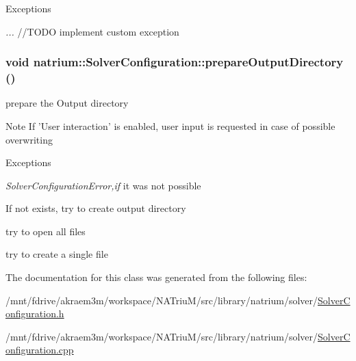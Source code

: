 \begin{DoxyExceptions}{Exceptions}
\item[{\em ...}]//TODO implement custom exception \end{DoxyExceptions}
\hypertarget{classnatrium_1_1SolverConfiguration_a69c009fd87690677b66ab10a000d07f6}{
\subsubsection[{prepareOutputDirectory}]{\setlength{\rightskip}{0pt plus 5cm}void natrium::SolverConfiguration::prepareOutputDirectory ()}}
\label{classnatrium_1_1SolverConfiguration_a69c009fd87690677b66ab10a000d07f6}


prepare the Output directory \begin{DoxyNote}{Note}
If 'User interaction' is enabled, user input is requested in case of possible overwriting 
\end{DoxyNote}

\begin{DoxyExceptions}{Exceptions}
\item[{\em SolverConfigurationError,if}]it was not possible \end{DoxyExceptions}


If not exists, try to create output directory

try to open all files

try to create a single file 

The documentation for this class was generated from the following files:\begin{DoxyCompactItemize}
\item 
/mnt/fdrive/akraem3m/workspace/NATriuM/src/library/natrium/solver/\hyperlink{SolverConfiguration_8h}{SolverConfiguration.h}\item 
/mnt/fdrive/akraem3m/workspace/NATriuM/src/library/natrium/solver/\hyperlink{SolverConfiguration_8cpp}{SolverConfiguration.cpp}\end{DoxyCompactItemize}
